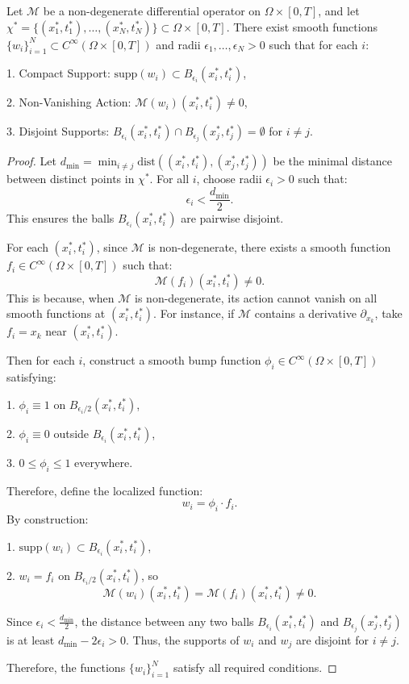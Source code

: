 \documentclass[10pt,a4paper]{amsart}
\begin{document}
\begin{lemma}\label{lem:B2}
    Let $\mathcal{M}$ be a non-degenerate differential operator on $\Omega \times [0,T]$, and let $\chi^* = \{(x^*_1,t^*_1),\dots,(x^*_N,t^*_N)\} \subset \Omega \times [0,T]$. There exist smooth functions $\{w_i\}_{i=1}^N \subset C^\infty(\Omega \times [0,T])$ and radii $\epsilon_1, \dots, \epsilon_N > 0$ such that for each $i$:  
    
1. Compact Support: $\text{supp}(w_i) \subset B_{\epsilon_i}(x^*_i,t^*_i)$,  

2. Non-Vanishing Action: $\mathcal{M}(w_i)(x^*_i,t^*_i) \neq 0$, 

3. Disjoint Supports: $B_{\epsilon_i}(x^*_i,t^*_i) \cap B_{\epsilon_j}(x^*_j,t^*_j) = \emptyset$ for $i \neq j$. 
\end{lemma} 

\begin{proof}
    Let $d_{\text{min}} = \min_{i \neq j} \text{dist}\left((x^*_i,t^*_i), (x^*_j,t^*_j)\right)$ be the minimal distance between distinct points in $\chi^*$. For all $i$, choose radii $\epsilon_i > 0$ such that:  
$$
\epsilon_i < \frac{d_{\text{min}}}{2}.
$$  
This ensures the balls $B_{\epsilon_i}(x^*_i,t^*_i)$ are pairwise disjoint.  

For each $(x^*_i,t^*_i)$, since $\mathcal{M}$ is non-degenerate, there exists a smooth function $f_i \in C^\infty(\Omega \times [0,T])$ such that:  
$$
\mathcal{M}(f_i)(x^*_i,t^*_i) \neq 0.
$$  This is because, when $\mathcal{M}$ is non-degenerate, its action cannot vanish on all smooth functions at $(x^*_i,t^*_i)$. For instance, if $\mathcal{M}$ contains a derivative $\partial_{x_k}$, take $f_i = x_k$ near $(x^*_i,t^*_i)$.

Then for each $i$, construct a smooth bump function $\phi_i \in C^\infty(\Omega \times [0,T])$ satisfying:  

1. $\phi_i \equiv 1$ on $B_{\epsilon_i/2}(x^*_i,t^*_i)$, 

2. $\phi_i \equiv 0$ outside $B_{\epsilon_i}(x^*_i,t^*_i)$, 

3. $0 \leq \phi_i \leq 1$ everywhere.  

Therefore, define the localized function:  
$$
w_i = \phi_i \cdot f_i.
$$  
By construction:  

1. $\text{supp}(w_i) \subset B_{\epsilon_i}(x^*_i,t^*_i)$,

2. $w_i = f_i$ on $B_{\epsilon_i/2}(x^*_i,t^*_i)$, so  
$$
\mathcal{M}(w_i)(x^*_i,t^*_i) = \mathcal{M}(f_i)(x^*_i,t^*_i) \neq 0.
$$  

Since $\epsilon_i < \frac{d_{\text{min}}}{2}$, the distance between any two balls $B_{\epsilon_i}(x^*_i,t^*_i)$ and $B_{\epsilon_j}(x^*_j,t^*_j)$ is at least $d_{\text{min}} - 2\epsilon_i > 0$. Thus, the supports of $w_i$ and $w_j$ are disjoint for $i \neq j$. 

Therefore, the functions $\{w_i\}_{i=1}^N$ satisfy all required conditions.  


\end{proof}
\end{document}
